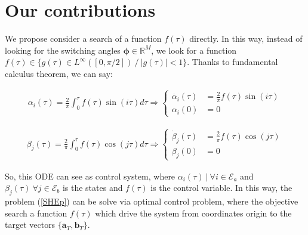 \section{Our contributions}
We propose consider a search of a function $f(\tau)$ directly. In this way, instead of looking for the switching angles $\bm{\phi} \in \mathbb{R}^M$, we look for a function $f(\tau) \in \{ g(\tau)  \in L^\infty([0,\pi/2])\ /\ |g(\tau)| < 1\} $. Thanks to fundamental calculus theorem, we can say:

\begin{gather}
    \alpha_i(\tau) = \frac{2}{\pi}\int_0^\tau f(\tau) \sin(i\tau)d\tau 
    \Rightarrow
    \begin{cases} \label{ode}
        \dot{\alpha_i}(\tau) & = \frac{2}{\pi}f(\tau)\sin(i\tau) \\  
        \alpha_i(0) & = 0       
    \end{cases}
\end{gather}

\begin{gather}
    \beta_j(\tau) = \frac{2}{\pi}\int_0^\tau f(\tau) \cos(j\tau)d\tau 
    \Rightarrow
    \begin{cases} \label{ode}
        \dot{\beta}_j(\tau) & = \frac{2}{\pi}f(\tau)\cos(j\tau) \\  
        \beta_j(0) & = 0       
    \end{cases}
\end{gather}



%
So, this ODE can see as control system, where $\alpha_i(\tau) \ | \ \forall i \in \mathcal{E}_a  $ and $ \beta_j(\tau) \ \forall j \in \mathcal{E}_b$ is the states and $f(\tau)$ is the control variable.
In this way, the problem (\ref{SHEp}) can be solve via optimal control problem, where the objective search a function $f(\tau)$ which drive the system from coordinates origin to the target vectors $\{ \bm{a}_T,\bm{b}_T\}$. 